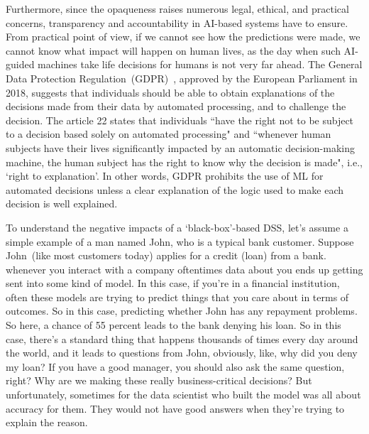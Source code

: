 \hspace*{3.5mm} Furthermore, since the opaqueness raises numerous legal, ethical, and practical concerns, transparency and accountability in AI-based systems have to ensure. From practical point of view, if we cannot see how the predictions were made, we cannot know what impact will happen on human lives, as the day when such AI-guided machines take life decisions for humans is not very far ahead. The General Data Protection Regulation~(GDPR)~\cite{kaminski2019right}, approved by the European Parliament in 2018, suggests that individuals should be able to obtain explanations of the decisions made from their data by automated processing, and to challenge the decision. The article 22 states that individuals ``have the right not to be subject to a decision based solely on automated processing" and ``whenever human subjects have their lives significantly impacted by an automatic decision-making machine, the human subject has the right to know why the decision is made", i.e., `right to explanation'. In other words, GDPR prohibits the use of ML for automated decisions unless a clear explanation of the logic used to make each decision is well explained. 

\hspace*{3.5mm} To understand the negative impacts of a `black-box'-based DSS, let's assume a simple example of a man named John, who is a typical bank customer. Suppose John~(like most customers today) applies for a credit (loan) from a bank. whenever you interact with a company oftentimes data about you ends up getting sent into some kind of model. In this case, if you're in a financial institution, often these models are trying to predict 
things that you care about in terms of outcomes. So in this case, predicting whether John has any repayment problems. So here, a chance of 55 percent leads to the bank denying his loan. So in this case, there's a standard thing that happens thousands of times every day around the world, and it leads to questions from John, obviously, like, why did you deny my loan? If you have a good manager, you should also ask the same question, right? Why are we making these really business-critical decisions?
But unfortunately, sometimes for the data scientist who built the model was all about accuracy for them. They would not have good answers when they're trying to explain the reason.

